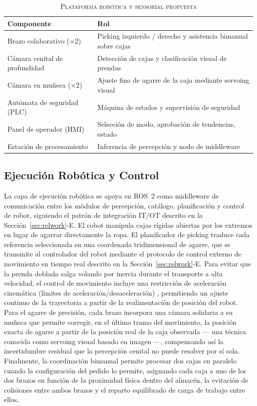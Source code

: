 \documentclass[conference]{IEEEtran}
\begin{document}
\begin{table}[!t]
\caption{\textsc{Plataforma robótica y sensorial propuesta}}
\label{tab:hw}
\centering
\footnotesize
\begin{tabular}{@{}p{3.1cm}p{4.5cm}@{}}
\toprule
\textbf{Componente} & \textbf{Rol} \\
\midrule
Brazo colaborativo (×2) & Picking izquierdo / derecho y asistencia bimanual
  sobre cajas \\
Cámara cenital de profundidad & Detección de cajas y clasificación visual de
  prendas \\
Cámara en muñeca (×2) & Ajuste fino de agarre de la caja mediante servoing
  visual \\
Autómata de seguridad (PLC) & Máquina de estados y supervisión de
  seguridad \\
Panel de operador (HMI) & Selección de modo, aprobación de tendencias,
  estado \\
Estación de procesamiento & Inferencia de percepción y nodo de middleware \\
\bottomrule
\end{tabular}
\end{table}


\subsection{Ejecución Robótica y Control}
\label{sec:robot}

La capa de ejecución robótica se apoya en ROS~2 como middleware de
comunicación entre los módulos de percepción, catálogo, planificación y
control de robot, siguiendo el patrón de integración IT/OT descrito en la
Sección~\ref{sec:relwork}-E. El cobot manipula cajas rígidas abiertas por
los extremos en lugar de agarrar directamente la ropa. El planificador de picking traduce cada
referencia seleccionada en una coordenada tridimensional de agarre, que se
transmite al controlador del robot mediante el protocolo de control externo
de movimiento en tiempo real descrito en la Sección~\ref{sec:relwork}-E.
Para evitar que la prenda doblada salga volando por inercia durante el
transporte a alta velocidad, el control de movimiento incluye una
restricción de aceleración cinemática (límites de aceleración/desaceleración) \cite{biagiotti2008trajectory},
permitiendo un ajuste continuo de la trayectoria a partir de la
realimentación de posición del robot. Para el agarre de precisión, cada
brazo incorpora una cámara solidaria a su muñeca que permite corregir, en el
último tramo del movimiento, la posición exacta de agarre a partir de la
posición real de la caja observada --- una técnica conocida como servoing
visual basado en imagen ---, compensando así la incertidumbre residual que
la percepción cenital no puede resolver por sí sola. Finalmente, la
coordinación bimanual permite procesar dos cajas en paralelo cuando la
configuración del pedido lo permite, asignando cada caja a uno de los dos
brazos en función de la proximidad física dentro del almacén, la evitación
de colisiones entre ambos brazos y el reparto equilibrado de carga de
trabajo entre ellos.
\end{document}
